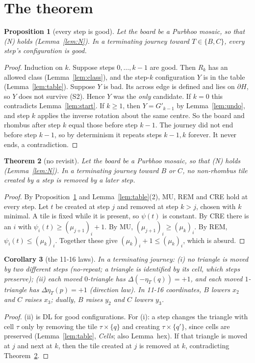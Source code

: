 \documentclass[11pt]{article}
\newtheorem{theorem}{Theorem}\newtheorem{lemma}[theorem]{Lemma}\newtheorem{proposition}[theorem]{Proposition}
\newtheorem{corollary}[theorem]{Corollary}
\theoremstyle{definition}\newtheorem{definition}[theorem]{Definition}\newtheorem{remark}[theorem]{Remark}
\begin{document}
\section{The theorem}\label{sec:thm}
\begin{proposition}[every step is good]\label{prop:good}
Let the board be a Purbhoo mosaic, so that (N) holds (Lemma~\ref{lem:N}). In a terminating journey toward $T\in\{B,C\}$, every step's configuration is good.
\end{proposition}
\begin{proof}
Induction on $k$. Suppose steps $0,\dots,k-1$ are good. Then $R_k$ has an allowed class (Lemma~\ref{lem:class}), and the step-$k$ configuration $Y$ is in the table (Lemma~\ref{lem:table}).
Suppose $Y$ is bad. Its across edge is defined and lies on $\partial H$, so $Y$ does not survive (S2). Hence $Y$ was the \emph{only} candidate.
If $k=0$ this contradicts Lemma~\ref{lem:start}. If $k\ge1$, then $Y=G'_{k-1}$ by Lemma~\ref{lem:undo}, and step $k$ applies the inverse rotation about the same centre. So the board and rhombus after step $k$ equal those before step $k-1$.
The journey did not end before step $k-1$, so by determinism it repeats steps $k-1,k$ forever. It never ends, a contradiction.
\end{proof}

\begin{theorem}[no revisit]\label{thm:main}
Let the board be a Purbhoo mosaic, so that (N) holds (Lemma~\ref{lem:N}). In a terminating journey toward $B$ or $C$, no non-rhombus tile created by a step is removed by a later step.
\end{theorem}
\begin{proof}
By Proposition~\ref{prop:good} and Lemma~\ref{lem:table}(2), MU, REM and CRE hold at every step.
Let $t$ be created at step $j$ and removed at step $k>j$, chosen with $k$ minimal. A tile is fixed while it is present, so $\psi(t)$ is constant.
By CRE there is an $i$ with $\psi_i(t)\ge(\mu_{j+1})_i+1$. By MU, $(\mu_{j+1})_i\ge(\mu_k)_i$. By REM, $\psi_i(t)\le(\mu_k)_i$. Together these give $(\mu_k)_i+1\le(\mu_k)_i$, which is absurd.
\end{proof}

\begin{corollary}[the 11-16 laws]\label{cor:dl}
In a terminating journey: (i) no triangle is moved by two different steps (\emph{no-repeat}; a triangle is identified by its cell, which steps preserve); (ii) each moved $0$-triangle has $\Delta(-\eta_T(q))=+1$, and each moved $1$-triangle has $\Delta\eta_T(p)=+1$ (\emph{direction law}). In 11-16 coordinates, $B$ lowers $x_2$ and $C$ raises $x_3$; dually, $B$ raises $y_2$ and $C$ lowers $y_3$.
\end{corollary}
\begin{proof}
(ii) is DL for good configurations. For (i): a step changes the triangle with cell $\tau$ only by removing the tile $\tau\times\{q\}$ and creating $\tau\times\{q'\}$, since cells are preserved (Lemma~\ref{lem:table}, \emph{Cells}; also Lemma~hex). If that triangle is moved at $j$ and next at $k$, then the tile created at $j$ is removed at $k$, contradicting Theorem~\ref{thm:main}.
\end{proof}
\end{document}
